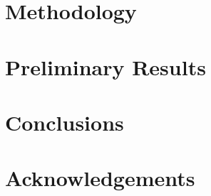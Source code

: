 \documentclass{sig-alternate}
\begin{document}
%
%
\section{Methodology}
\label{sec:methodology}

%
%
\section{Preliminary Results}
\label{sec:results}

%
%
\section{Conclusions}
\label{sec:conclusions}

%
%
\section{Acknowledgements}



\end{document}
